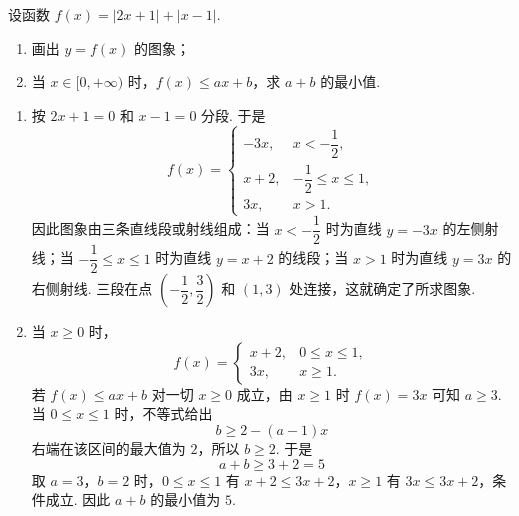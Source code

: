 \begin{problem}
设函数 \(f(x)=|2x+1|+|x-1|\).

\begin{enumerate}
\item 画出 \(y=f(x)\) 的图象；
\item 当 \(x\in[0,+\infty)\) 时，\(f(x)\le ax+b\)，求 \(a+b\) 的最小值.
\end{enumerate}

\end{problem}

\begin{solution}
\begin{enumerate}
\item 按 \(2x+1=0\) 和 \(x-1=0\) 分段. 于是
\[
f(x)=
\begin{cases}
-3x, & x<-\dfrac12,\\
x+2, & -\dfrac12\le x\le1,\\
3x, & x>1.
\end{cases}
\]
因此图象由三条直线段或射线组成：当 \(x<-\dfrac12\) 时为直线 \(y=-3x\) 的左侧射线；当 \(-\dfrac12\le x\le1\) 时为直线 \(y=x+2\) 的线段；当 \(x>1\) 时为直线 \(y=3x\) 的右侧射线. 三段在点 \(\left(-\dfrac12,\dfrac32\right)\) 和 \(\left(1,3\right)\) 处连接，这就确定了所求图象.
\item 当 \(x\ge0\) 时，
\[
f(x)=
\begin{cases}
x+2, & 0\le x\le1,\\
3x, & x\ge1.
\end{cases}
\]
若 \(f(x)\le ax+b\) 对一切 \(x\ge0\) 成立，由 \(x\ge1\) 时 \(f(x)=3x\) 可知 \(a\ge3\). 当 \(0\le x\le1\) 时，不等式给出
\[
b\ge 2-(a-1)x
\]
右端在该区间的最大值为 \(2\)，所以 \(b\ge2\). 于是
\[
a+b\ge3+2=5
\]
取 \(a=3\)，\(b=2\) 时，\(0\le x\le1\) 有 \(x+2\le3x+2\)，\(x\ge1\) 有 \(3x\le3x+2\)，条件成立. 因此 \(a+b\) 的最小值为 \(5\).
\end{enumerate}
\end{solution}
